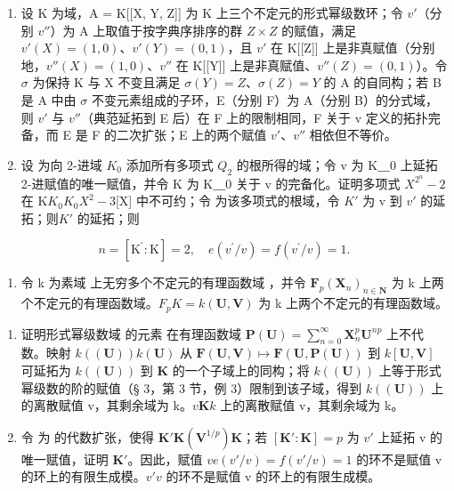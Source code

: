
\begin{enumerate}
\def\labelenumi{\arabic{enumi}.}
\item
  设 K 为域，A = K{[}{[}X, Y, Z{]}{]} 为 K 上三个不定元的形式幂级数环；令 \(v'\)（分别 \(v''\)）为 A 上取值于按字典序排序的群 \(Z \times Z\) 的赋值，满足 \(v'(X) = (1, 0)\)、\(v'(Y) = (0, 1)\)，且 \(v'\) 在 K{[}{[}Z{]}{]} 上是非真赋值（分别地，\(v''(X) = (1, 0)\)、\(v''\) 在 K{[}{[}Y{]}{]} 上是非真赋值、\(v''(Z) = (0, 1)\)）。令 \(\sigma\) 为保持 K 与 X 不变且满足 \(\sigma(Y) = Z\)、\(\sigma(Z) = Y\) 的 A 的自同构；若 B 是 A 中由 \(\sigma\) 不变元素组成的子环，E（分别 F）为 A（分别 B）的分式域，则 \(v'\) 与 \(v''\)（典范延拓到 E 后）在 F 上的限制相同，F 关于 v 定义的拓扑完备，而 E 是 F 的二次扩张；E 上的两个赋值 \(v'\)、\(v''\) 相依但不等价。
\item
  设  为向 2-进域 \(K_{0}\) 添加所有多项式 \(Q_{2}\) 的根所得的域；令 v 为 K＿0 上延拓 2-进赋值的唯一赋值，并令 K 为 K＿0 关于 v 的完备化。证明多项式 \(X^{2^{n}} - 2\) 在 K\(K_{0}\)\(K_{0}\)\(X^{2} - 3\){[}X{]} 中不可约；令  为该多项式的根域，令 \(K'\) 为 v 到 \(v'\) 的延拓；则\(K'\) 的延拓；则
\end{enumerate}

\[
n = \left[ \mathrm{K} ^ {\prime}: \mathrm{K} \right] = 2, \quad e (v ^ {\prime} / v) = f (v ^ {\prime} / v) = 1.
\]

\begin{enumerate}
\def\labelenumi{\arabic{enumi}.}
\setcounter{enumi}{2}
\tightlist
\item
  令 k 为素域  上无穷多个不定元的有理函数域 ，并令 \(\mathbf{F}_{p}(\mathbf{X}_{n})_{n\in\mathbf{N}}\) 为 k 上两个不定元的有理函数域。\(F_{p}\)\(K = k(\mathbf{U}, \mathbf{V})\) 为 k 上两个不定元的有理函数域。
\end{enumerate}

\begin{enumerate}
\def\labelenumi{(\alph{enumi})}
\item
  证明形式幂级数域  的元素  在有理函数域 \(\mathbf{P}(\mathbf{U}) = \sum_{n=0}^{\infty} \mathbf{X}_n^p \mathbf{U}^{np}\) 上不代数。映射 \(k((\mathbf{U}))\)\(k(\mathbf{U})\) 从 \(\mathbf{F}(\mathbf{U}, \mathbf{V}) \mapsto \mathbf{F}(\mathbf{U}, \mathbf{P}(\mathbf{U}))\) 到 \(k[\mathbf{U}, \mathbf{V}]\) 可延拓为 \(k((\mathbf{U}))\) 到 \(\mathbf{K}\) 的一个子域上的同构；将 \(k((\mathbf{U}))\) 上等于形式幂级数的阶的赋值（§ 3，第 3 节，例 3）限制到该子域，得到 \(k((\mathbf{U}))\) 上的离散赋值 v，其剩余域为 k。\(v\)\(\mathbf{K}\)\(k\) 上的离散赋值 v，其剩余域为 k。
\item
  令  为  的代数扩张，使得 \(\mathbf{K}'\)\(\mathbf{K}(\mathbf{V}^{1/p})\)\(\mathbf{K}\)；若 \([\mathbf{K}':\mathbf{K}] = p\) 为 \(v'\) 上延拓 v 的唯一赋值，证明 \(\mathbf{K}'\)。因此，赋值 \(v\)\(e(v'/v) = f(v'/v) = 1\) 的环不是赋值 v 的环上的有限生成模。\(v'\)\(v\) 的环不是赋值 v 的环上的有限生成模。
\end{enumerate}

